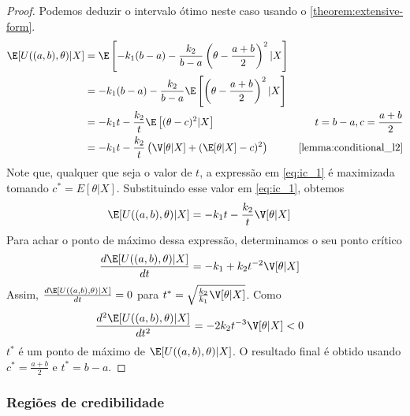 \begin{proof}
 Podemos deduzir o intervalo ótimo neste caso 
 usando o \cref{theorem:extensive-form}.
 \begin{align}
  \label{eq:ic_1}
  \E[U((a,b),\theta)|X]	
  &= \E\left[-k_{1}(b-a)-\frac{k_{2}}{b-a}\left(\theta - \frac{a+b}{2}\right)^{2}|X\right]	\nonumber \\
  &= -k_{1}(b-a) -\frac{k_{2}}{b-a}\E\left[\left(\theta - \frac{a+b}{2}\right)^{2}|X\right]	\nonumber \\
  &= -k_{1}t -\frac{k_{2}}{t}\E\left[(\theta-c)^{2}|X\right]
  & t=b-a, c=\frac{a+b}{2} \nonumber \\
  &= -k_{1}t -\frac{k_{2}}{t}\left(\V[\theta|X]
  +(\E[\theta|X]-c)^{2}\right)
  & \text{\cref{lemma:conditional_l2}}
 \end{align}
 Note que, qualquer que seja o valor de $t$, 
 a expressão em \cref{eq:ic_1} é maximizada 
 tomando $c^{*}=E[\theta|X]$.
 Substituindo esse valor em \cref{eq:ic_1}, obtemos
 \begin{align*}
  \E[U((a,b),\theta)|X]	
  &= -k_{1}t -\frac{k_{2}}{t}\V[\theta|X]
 \end{align*}
 Para achar o ponto de máximo dessa expressão, 
 determinamos o seu ponto crítico
 \begin{align*}
  \frac{d\E[U((a,b),\theta)|X]}{dt}	
  &= -k_{1} +k_{2}t^{-2}\V[\theta|X]
 \end{align*}
 Assim, $\frac{d\E[U((a,b),\theta)|X]}{dt}=0$ para 
 $t^{*} = \sqrt{\frac{k_2}{k_1}\V[\theta|X]}$.
 Como
 \begin{align*}
  \frac{d^{2}\E[U((a,b),\theta)|X]}{dt^{2}} 
  &= -2k_{2}t^{-3}\V[\theta|X] < 0
 \end{align*}
 $t^{*}$ é um ponto de máximo de 
 $\E[U((a,b),\theta)|X]$.
 O resultado final é obtido usando 
 $c^{*}=\frac{a+b}{2}$ e $t^{*}=b-a$.
\end{proof}

\subsubsection{Regiões de credibilidade}

